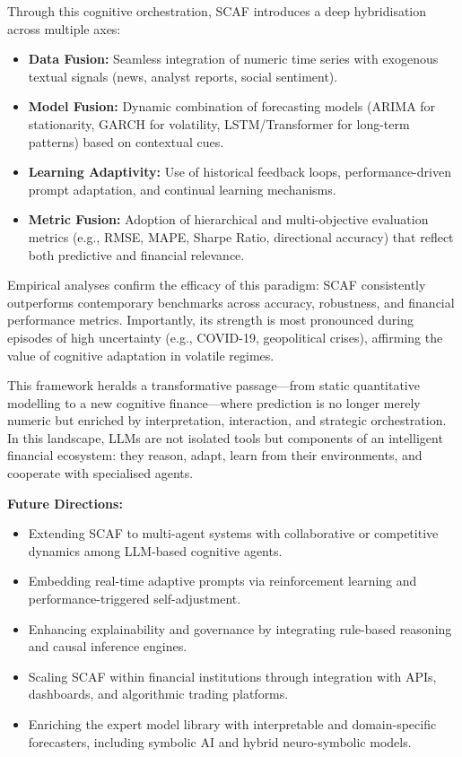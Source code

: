 \documentclass[conference]{IEEEtran}
\begin{document}
Through this cognitive orchestration, SCAF introduces a deep hybridisation across multiple axes:
\begin{itemize}
  \item \textbf{Data Fusion:} Seamless integration of numeric time series with exogenous textual signals (news, analyst reports, social sentiment).
  \item \textbf{Model Fusion:} Dynamic combination of forecasting models (ARIMA for stationarity, GARCH for volatility, LSTM/Transformer for long-term patterns) based on contextual cues.
  \item \textbf{Learning Adaptivity:} Use of historical feedback loops, performance-driven prompt adaptation, and continual learning mechanisms.
  \item \textbf{Metric Fusion:} Adoption of hierarchical and multi-objective evaluation metrics (e.g., RMSE, MAPE, Sharpe Ratio, directional accuracy) that reflect both predictive and financial relevance.
\end{itemize}

Empirical analyses confirm the efficacy of this paradigm: SCAF consistently outperforms contemporary benchmarks across accuracy, robustness, and financial performance metrics. Importantly, its strength is most pronounced during episodes of high uncertainty (e.g., COVID-19, geopolitical crises), affirming the value of cognitive adaptation in volatile regimes.

This framework heralds a transformative passage—from static quantitative modelling to a new cognitive finance—where prediction is no longer merely numeric but enriched by interpretation, interaction, and strategic orchestration. In this landscape, LLMs are not isolated tools but components of an intelligent financial ecosystem: they reason, adapt, learn from their environments, and cooperate with specialised agents.

\textbf{Future Directions:}
\begin{itemize}
    \item Extending SCAF to multi-agent systems with collaborative or competitive dynamics among LLM-based cognitive agents.
    \item Embedding real-time adaptive prompts via reinforcement learning and performance-triggered self-adjustment.
    \item Enhancing explainability and governance by integrating rule-based reasoning and causal inference engines.
    \item Scaling SCAF within financial institutions through integration with APIs, dashboards, and algorithmic trading platforms.
    \item Enriching the expert model library with interpretable and domain-specific forecasters, including symbolic AI and hybrid neuro-symbolic models.
\end{itemize}
\end{document}
